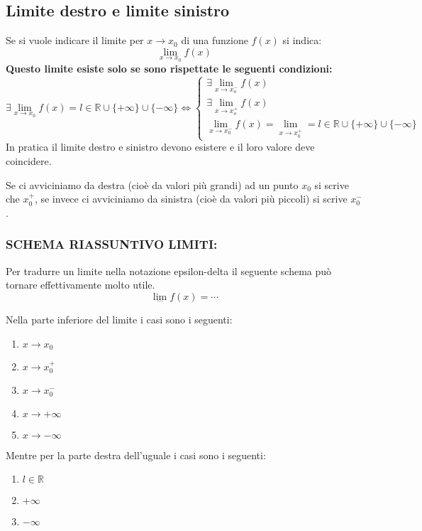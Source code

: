 \subsection{Limite destro e limite sinistro}
Se si vuole indicare il limite per $x \to x_0$ di una funzione $f(x)$ si indica:
\begin{equation*}
	\lim_{x \to x_0} f(x)
\end{equation*}
\textbf{Questo limite esiste solo se sono rispettate le seguenti condizioni:}
\begin{equation*}
	\exists \lim_{x \to x_0} f(x) = l \in \mathbb{R} \cup \{+\infty\} \cup \{-\infty\}\iff 
	\begin{cases*}
		\exists \lim_{x \to x_o^-} f(x)\\
		\exists \lim_{x \to x_o^+} f(x)\\
		\lim_{x \to x_0^-} f(x) = \lim_{x \to x_0^+} = l \in \mathbb{R} \cup \{+\infty\} \cup \{-\infty\}
	\end{cases*}
\end{equation*}
In pratica il limite destro e sinistro devono esistere e il loro valore deve coincidere.

Se ci avviciniamo da destra (cioè da valori più grandi) ad un punto $x_0$ si scrive che $x_0^+$, se invece ci avviciniamo da sinistra (cioè da valori più piccoli) si scrive $x_0^-$.

\subsubsection{SCHEMA RIASSUNTIVO LIMITI:} 
Per tradurre un limite nella notazione epsilon-delta il seguente schema può tornare effettivamente molto utile.
\begin{equation*}
	\lim_{\cdots} f(x) = \cdots
\end{equation*}

Nella parte inferiore del limite i casi sono i seguenti:
\begin{enumerate}[label=(\roman*)]
    \item $x\to x_0$
    \item $x\to x_0^+$
    \item $x\to x_0^-$
    \item $x\to +\infty$
    \item $x\to -\infty$
\end{enumerate}

Mentre per la parte destra dell'uguale i casi sono i seguenti:
\begin{enumerate}
    \item $l \in \mathbb{R}$
    \item $+ \infty$
    \item $- \infty$
\end{enumerate}

